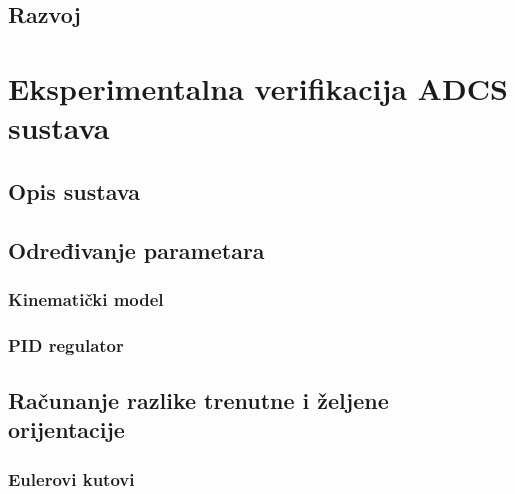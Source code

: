 \documentclass[times, utf8, diplomski, numeric]{templates/template}
\begin{document}
{    \section{Razvoj}{
    }
}

\chapter{Eksperimentalna verifikacija ADCS sustava}{
    \section{Opis sustava}{
    }

    \section{Određivanje parametara}{
        \subsection{Kinematički model}{
        }
    
        \subsection{PID regulator}{
        }
    }

    \section{Računanje razlike trenutne i željene orijentacije}{
        \subsection{Eulerovi kutovi}{
        }

}}
\end{document}

